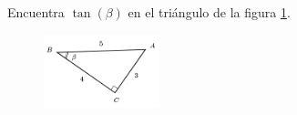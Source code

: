 Encuentra $\tan(\beta)$ en el triángulo de la figura \ref{fig:functrig15}.
\begin{figure}[H]
    \begin{center}
        \includegraphics[width=0.3\textwidth]{../images/functrig15.png}
    \end{center}
    \caption{}
    \label{fig:functrig15}
\end{figure}
